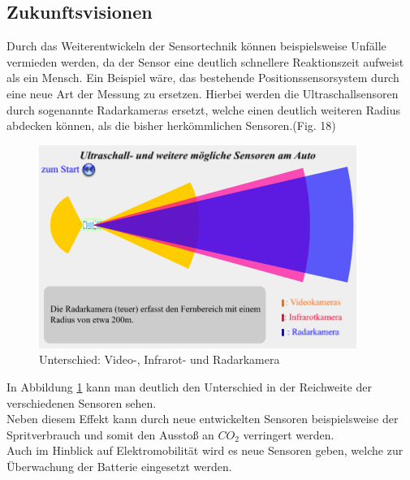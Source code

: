 \begin{flushleft}
	             
	             \subsection{Zukunftsvisionen} 
	                  Durch das Weiterentwickeln der Sensortechnik können beispielsweise Unfälle vermieden werden, da der Sensor eine deutlich schnellere Reaktionszeit aufweist als ein Mensch.
	                  Ein Beispiel wäre, das bestehende Positionssensorsystem durch eine neue Art der Messung zu ersetzen. Hierbei werden die Ultraschallsensoren 
	                  durch sogenannte Radarkameras ersetzt, welche einen deutlich weiteren Radius abdecken können, als die bisher herkömmlichen Sensoren.(Fig. 18)
	                  
	                  \begin{figure}
	                      \includegraphics[width=\textwidth] {radarsensor.png}
	                      \caption[www.leifiphysik.de/akustik/schallgeschwindigkeit/ausblick/ultraschall-beim-auto]{Unterschied: Video-, Infrarot- und Radarkamera}
	                      \label{fig:TS12}
	                  \end{figure}
	     
	                     In Abbildung \ref{fig:TS12} kann man deutlich den Unterschied in der Reichweite der verschiedenen Sensoren sehen.\\
	                     
	                     Neben diesem Effekt kann durch neue entwickelten Sensoren beispielsweise der Spritverbrauch und somit den Ausstoß an $CO_2$ verringert werden.\\
	                     Auch im Hinblick auf Elektromobilität wird es neue Sensoren geben, welche zur Überwachung der Batterie eingesetzt werden.
\end{flushleft}